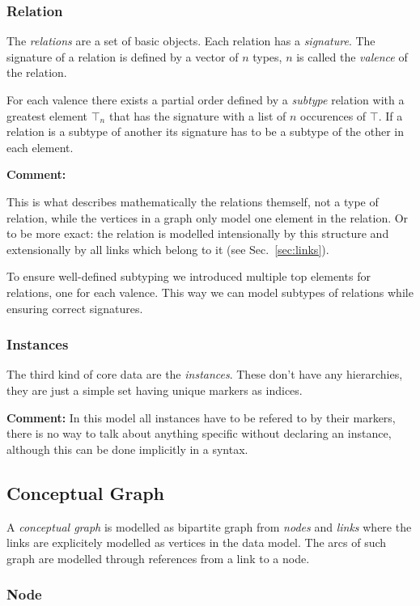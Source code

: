 \documentclass{article}
\newcommand{\defname}{\textit}
\newcommand{\comment}{\textbf{Comment: }}
\begin{document}
\subsubsection{Relation}

The \defname{relations} are a set of basic objects. Each relation has
 a \defname{signature}. The signature of a relation is defined by a vector
 of $n$ types, $n$ is called the \defname{valence} of the relation.

For each valence there exists a partial order defined by a
\defname{subtype} relation with a greatest element $\top_n$ that has
the signature with a list of $n$ occurences of $\top$. If a relation is a
subtype of another its signature has to be a subtype of the other in
each element.

\comment{This is what describes mathematically the relations themself,
not a type of relation, while the vertices in a graph only model one
element in the relation. Or to be more exact: the relation is modelled
intensionally by this structure and extensionally by all links which
belong to it (see Sec.~\ref{sec:links}).

To ensure well-defined subtyping we introduced multiple top elements for
relations, one for each valence. This way we can model subtypes of relations
while ensuring correct signatures.}

\subsubsection{Instances}

The third kind of core data are the \defname{instances}. These don't have
any hierarchies, they are just a simple set having unique markers as indices.

\comment{In this model all instances have to be refered to by their markers,
there is no way to talk about anything specific without declaring an
instance, although this can be done implicitly in a syntax.}

\subsection{Conceptual Graph}

A \defname{conceptual graph} is modelled as bipartite graph from
\defname{nodes} and \defname{links} where the links are explicitely modelled
as vertices in the data model. The arcs of such graph are
modelled through references from a link to a node.

\subsubsection{Node}
\end{document}
